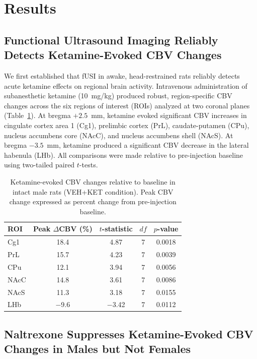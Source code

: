 \documentclass[11pt]{article}
\begin{document}
\section{Results}

\subsection{Functional Ultrasound Imaging Reliably Detects Ketamine-Evoked CBV Changes}

We first established that fUSI in awake, head-restrained rats reliably detects acute ketamine effects on regional brain activity. Intravenous administration of subanesthetic ketamine (10~mg/kg) produced robust, region-specific CBV changes across the six regions of interest (ROIs) analyzed at two coronal planes (Table~\ref{tab:ketamine_baseline}). At bregma $+2.5$~mm, ketamine evoked significant CBV increases in cingulate cortex area 1 (Cg1), prelimbic cortex (PrL), caudate-putamen (CPu), nucleus accumbens core (NAcC), and nucleus accumbens shell (NAcS). At bregma $-3.5$~mm, ketamine produced a significant CBV decrease in the lateral habenula (LHb). All comparisons were made relative to pre-injection baseline using two-tailed paired $t$-tests.

\begin{table}[H]
\centering
\caption{Ketamine-evoked CBV changes relative to baseline in intact male rats (VEH+KET condition). Peak CBV change expressed as percent change from pre-injection baseline.}
\label{tab:ketamine_baseline}
\begin{tabular}{lcccc}
\toprule
ROI & Peak $\Delta$CBV (\%) & $t$-statistic & $df$ & $p$-value \\
\midrule
Cg1 & 18.4 & 4.87 & 7 & 0.0018 \\
PrL & 15.7 & 4.23 & 7 & 0.0039 \\
CPu & 12.1 & 3.94 & 7 & 0.0056 \\
NAcC & 14.8 & 3.61 & 7 & 0.0086 \\
NAcS & 11.3 & 3.18 & 7 & 0.0155 \\
LHb & $-$9.6 & $-$3.42 & 7 & 0.0112 \\
\bottomrule
\end{tabular}
\end{table}

\subsection{Naltrexone Suppresses Ketamine-Evoked CBV Changes in Males but Not Females}
\end{document}
